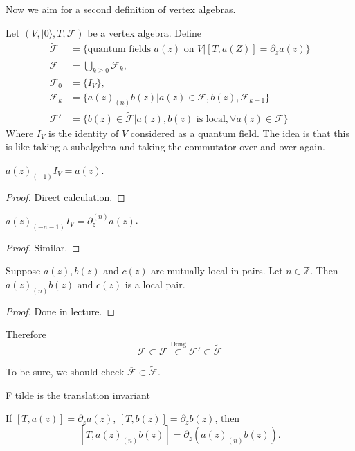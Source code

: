 \noindent
Now we aim for a second definition of vertex algebras.

Let $(V,|0\rangle,T,\mathcal{F})$ be a vertex algebra.
Define
\begin{align*}
\tilde{\mathcal{F}}&=\{\text{quantum fields $a(z)$ on $V$}
|[T,a(Z)]=\partial_za(z)\}\\
\overline{\mathcal{F}}&=\bigcup_{k\geq 0}\mathcal{F}_k,\\
\mathcal{F}_0&=\{I_V\},\\
\mathcal{F}_k&=\{a(z)_{(n)}b(z)|a(z)\in \mathcal{F},b(z),\mathcal{F}_{k-1}\}\\
\mathcal{F}'&=\{b(z) \in \tilde{\mathcal{F}}|a(z),b(z)\text{ is local},
\forall  a(z) \in \mathcal{F}\}
\end{align*}
Where $I_V$ is the identity of $V$ considered as a quantum field.
The idea is that this is like taking a subalgebra and taking
the commutator over and over again.

\begin{lemma}
\label{lemma-simple-lemma1}
$a(z)_{(-1)}I_V=a(z)$.
\end{lemma}

\begin{proof}
Direct calculation.
\end{proof}

\begin{lemma}
\label{lemma-simple-lemma2}
$a(z)_{(-n-1)}I_V=\partial_z^{(n)}a(z)$.
\end{lemma}

\begin{proof}
Similar.
\end{proof}

\begin{lemma}[Dong]
\label{lemma-dong}
Suppose $a(z),b(z)$ and $c(z)$ are mutually local in pairs.
Let $n \in \mathbb{Z}$. Then $a(z)_{(n)}b(z)$ and $c(z)$
is a local pair.
\end{lemma}

\begin{proof}
Done in lecture.
\end{proof}

Therefore
$$
\mathcal{F} \subset \overline{\mathcal{F}}\overset{\text{Dong}}{\subset}
\mathcal{F}'\subset \tilde{\mathcal{F}}
$$
\begin{remark}
\label{remark-Fbar-subset-Ftilde}
To be sure, we should check $\overline{\mathcal{F}}\subset \tilde{\mathcal{F}}$.
\end{remark}

F tilde is the translation invariant
\begin{exercise}
\label{exercise-Fbar-subset-Ftilde}
If $[T,a(z)]=\partial_za(z)$, $[T,b(z)]=\partial_zb(z)$,
then
$$
[T,a(z)_{(n)}b(z)]=\partial_z(a(z)_{(n)}b(z)).
$$
\end{exercise}

